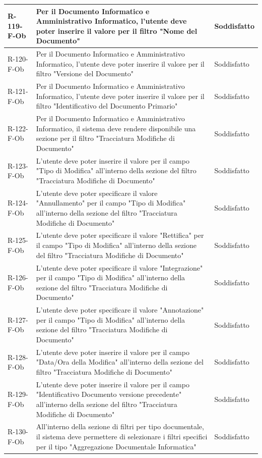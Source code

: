\begin{longtable}{|p{2.5cm}|p{9.5cm}|p{2.5cm}|}
R-119-F-Ob & Per il Documento Informatico e Amministrativo Informatico, l'utente deve poter inserire il valore per il filtro "Nome del Documento" & Soddisfatto \\
\hline
R-120-F-Ob & Per il Documento Informatico e Amministrativo Informatico, l'utente deve poter inserire il valore per il filtro "Versione del Documento" & Soddisfatto \\
\hline
R-121-F-Ob & Per il Documento Informatico e Amministrativo Informatico, l'utente deve poter inserire il valore per il filtro "Identificativo del Documento Primario" & Soddisfatto \\
\hline
R-122-F-Ob & Per il Documento Informatico e Amministrativo Informatico, il sistema deve rendere disponibile una sezione per il filtro "Tracciatura Modifiche di Documento" & Soddisfatto \\
\hline
R-123-F-Ob & L'utente deve poter inserire il valore per il campo "Tipo di Modifica" all'interno della sezione del filtro "Tracciatura Modifiche di Documento" & Soddisfatto \\
\hline
R-124-F-Ob & L'utente deve poter specificare il valore "Annullamento" per il campo "Tipo di Modifica" all'interno della sezione del filtro "Tracciatura Modifiche di Documento" & Soddisfatto \\
\hline
R-125-F-Ob & L'utente deve poter specificare il valore "Rettifica" per il campo "Tipo di Modifica" all'interno della sezione del filtro "Tracciatura Modifiche di Documento" & Soddisfatto \\
\hline
R-126-F-Ob & L'utente deve poter specificare il valore "Integrazione" per il campo "Tipo di Modifica" all'interno della sezione del filtro "Tracciatura Modifiche di Documento" & Soddisfatto \\
\hline
R-127-F-Ob & L'utente deve poter specificare il valore "Annotazione" per il campo "Tipo di Modifica" all'interno della sezione del filtro "Tracciatura Modifiche di Documento" & Soddisfatto \\
\hline
R-128-F-Ob & L'utente deve poter inserire il valore per il campo "Data/Ora della Modifica" all'interno della sezione del filtro "Tracciatura Modifiche di Documento" & Soddisfatto \\
\hline
R-129-F-Ob & L'utente deve poter inserire il valore per il campo "Identificativo Documento versione precedente" all'interno della sezione del filtro "Tracciatura Modifiche di Documento" & Soddisfatto \\
\hline

R-130-F-Ob & All'interno della sezione di filtri per tipo documentale, il sistema deve permettere di selezionare i filtri specifici per il tipo "Aggregazione Documentale Informatica" & Soddisfatto \\
\hline


\end{longtable}
